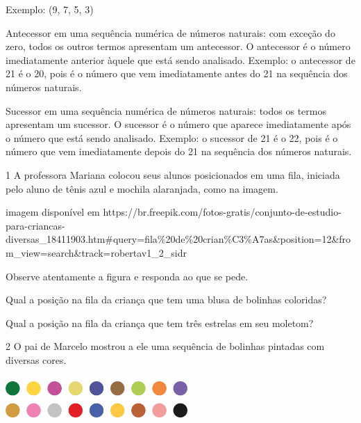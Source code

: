 \begin{escolha}
Exemplo: (9, 7, 5, 3)

Antecessor em uma sequência numérica de números naturais: com exceção do zero,
todos os outros termos apresentam um antecessor. O antecessor é o número
imediatamente anterior àquele que está sendo analisado. Exemplo: o
antecessor de 21 é o 20, pois é o número que vem imediatamente antes do 21 na sequência dos números naturais.

Sucessor em uma sequência numérica de números naturais: todos os termos
apresentam um sucessor. O sucessor é o número que aparece imediatamente após o número que está sendo analisado. Exemplo: o sucessor de 21 é o 22, pois é o
número que vem imediatamente depois do 21 na sequência dos números naturais.


\num{1} A professora Mariana colocou seus alunos posicionados em uma fila, iniciada pelo aluno de tênis azul e mochila alaranjada, como na imagem.

\inserir imagem disponível em https://br.freepik.com/fotos-gratis/conjunto-de-estudio-para-criancas-diversas_18411903.htm#query=fila\%20de\%20crian\%C3\%A7as&position=12&from_view=search\&track=robertav1_2_sidr

Observe atentamente a figura e responda ao que se pede.

\begin{escolha}

  \item Qual a posição na fila da criança que tem uma blusa de bolinhas coloridas?


  \item Qual a posição na fila da criança que tem três estrelas em seu moletom?


\end{escolha}

\num{2} O pai de Marcelo mostrou a ele uma sequência de bolinhas pintadas com
diversas cores.


\includegraphics[width=2.72524in,height=0.68339in]{media/image28.png}


\end{escolha}
